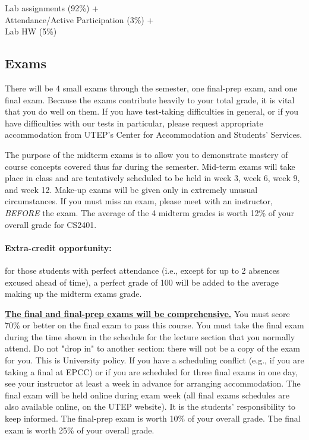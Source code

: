 \documentclass[12pt]{scrartcl}
\begin{document}
\begin{tcolorbox}[colback=blue!5,colframe=blue!75!black,title=Lab Grade]
\begin{center}

Lab assignments (92\%) + \\
Attendance/Active Participation (3\%) +\\
Lab HW (5\%)
\end{center}

\end{tcolorbox}

\subsection{Exams}
There will be 4 small exams through the semester, one final-prep exam, and one final exam. 
Because the exams contribute heavily to your total grade, it is vital that you do well on them. 
If you have test-taking difficulties in general, or if you have difficulties with our tests in particular, please request appropriate accommodation from UTEP’s Center for Accommodation and Students’ Services.

The purpose of the midterm exams is to allow you to demonstrate mastery of course concepts covered thus far during the semester. 
Mid-term exams will take place 
in class 
and are tentatively scheduled to be held in week 3, week 6, week 9, and week 12. 
Make-up exams will be given only in extremely unusual circumstances. 
If you must miss an exam, please meet with an instructor, \textit{BEFORE} the exam. 
The average of the 4 midterm grades is worth 12\% of your overall grade for CS2401.
 
\paragraph{Extra-credit opportunity:} 
for those students with perfect attendance (i.e., except for up to 2 absences excused ahead of time), a perfect grade of 100 will be added to the average making up the midterm exams grade.

\textbf{\underline{The final and final-prep exams will be comprehensive.}}
You must score 70\% or better on the final exam to pass this course. 
You must take the final exam during the time shown in the schedule for the lecture section that you normally attend. 
Do not "drop in" to another section: there will not be a copy of the exam for you. 
This is University policy. If you have a scheduling conflict (e.g., if you are taking a final at EPCC) or if you are scheduled for three final exams in one day, see your instructor at least a week in advance for arranging accommodation.
 The final exam will be held online during exam week (all final exams schedules are also available online, on the UTEP website). 
 It is the students’ responsibility to keep informed.  The final-prep exam is worth 10\% of your overall grade. The final exam is worth 25\% of your overall grade. 
\end{document}

